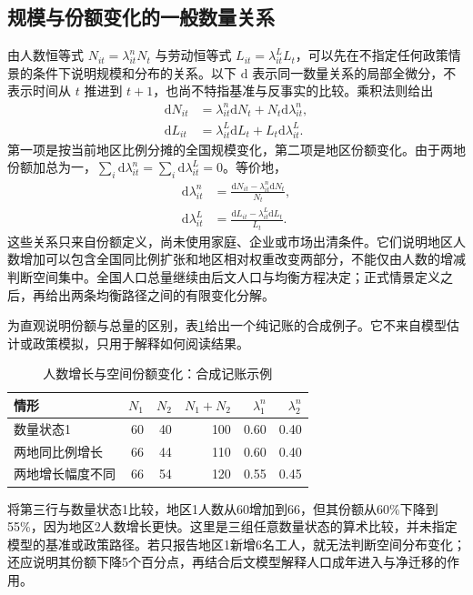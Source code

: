 \documentclass[UTF8,a4paper,zihao=-4,fontset=windows]{ctexart}
\numberwithin{equation}{section}
\newcommand{\dd}{\mathrm{d}}
\begin{document}
\subsection{规模与份额变化的一般数量关系}
由人数恒等式 $N_{it}=\lambda^n_{it}N_t$ 与劳动恒等式 $L_{it}=\lambda^L_{it}L_t$，可以先在不指定任何政策情景的条件下说明规模和分布的关系。以下 $\dd$ 表示同一数量关系的局部全微分，不表示时间从 $t$ 推进到 $t+1$，也尚不特指基准与反事实的比较。乘积法则给出
\begin{align}
 \dd N_{it}&=\lambda^n_{it}\dd N_t+N_t\dd\lambda^n_{it},\\
 \dd L_{it}&=\lambda^L_{it}\dd L_t+L_t\dd\lambda^L_{it}.
 \label{eq:scale-spatial-differential}
\end{align}
第一项是按当前地区比例分摊的全国规模变化，第二项是地区份额变化。由于两地份额加总为一，$\sum_i\dd\lambda^n_{it}=\sum_i\dd\lambda^L_{it}=0$。等价地，
\begin{align}
 \dd\lambda^n_{it}&=\frac{\dd N_{it}-\lambda^n_{it}\dd N_t}{N_t},\\
 \dd\lambda^L_{it}&=\frac{\dd L_{it}-\lambda^L_{it}\dd L_t}{L_t}.
 \label{eq:share-general-differential}
\end{align}
这些关系只来自份额定义，尚未使用家庭、企业或市场出清条件。它们说明地区人数增加可以包含全国同比例扩张和地区相对权重改变两部分，不能仅由人数的增减判断空间集中。全国人口总量继续由后文人口与均衡方程决定；正式情景定义之后，再给出两条均衡路径之间的有限变化分解。

为直观说明份额与总量的区别，表\ref{tab:spatial-accounting-example}给出一个纯记账的合成例子。它不来自模型估计或政策模拟，只用于解释如何阅读结果。
\begin{table}[htbp]
\centering
\caption{人数增长与空间份额变化：合成记账示例}
\label{tab:spatial-accounting-example}
\begin{tabular}{lrrrrr}
\toprule 情形 & $N_1$ & $N_2$ & $N_1+N_2$ & $\lambda^n_1$ & $\lambda^n_2$\\\midrule
数量状态1 & 60 & 40 & 100 & 0.60 & 0.40\\
两地同比例增长 & 66 & 44 & 110 & 0.60 & 0.40\\
两地增长幅度不同 & 66 & 54 & 120 & 0.55 & 0.45\\\bottomrule
\end{tabular}
\end{table}
将第三行与数量状态1比较，地区1人数从60增加到66，但其份额从60\%下降到55\%，因为地区2人数增长更快。这里是三组任意数量状态的算术比较，并未指定模型的基准或政策路径。若只报告地区1新增6名工人，就无法判断空间分布变化；还应说明其份额下降5个百分点，再结合后文模型解释人口成年进入与净迁移的作用。
\end{document}
